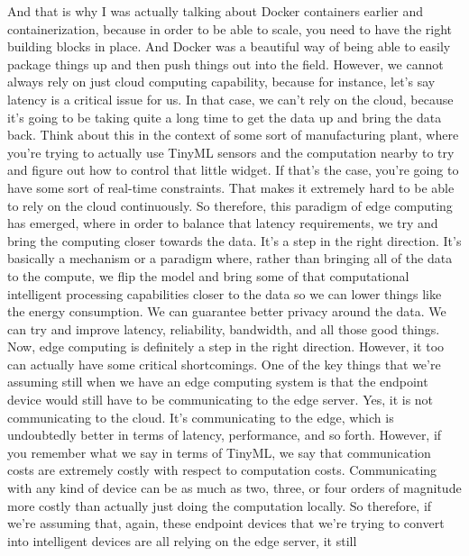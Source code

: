 {{{{{    And that is why I was actually talking about Docker containers earlier
    and containerization, because in order to be able to scale,
    you need to have the right building blocks in place.
    And Docker was a beautiful way of being able to easily
    package things up and then push things out into the field.
    However, we cannot always rely on just cloud computing capability,
    because for instance, let's say latency is a critical issue for us.
    In that case, we can't rely on the cloud,
    because it's going to be taking quite a long time to get the data up and bring
    the data back.
    Think about this in the context of some sort of manufacturing plant, where
    you're trying to actually use TinyML sensors and the computation
    nearby to try and figure out how to control that little widget.
    If that's the case, you're going to have some sort of real-time constraints.
    That makes it extremely hard to be able to rely on the cloud continuously.
    So therefore, this paradigm of edge computing
    has emerged, where in order to balance that latency requirements,
    we try and bring the computing closer towards the data.
    It's a step in the right direction.
    It's basically a mechanism or a paradigm where,
    rather than bringing all of the data to the compute, we flip the model
    and bring some of that computational intelligent processing capabilities
    closer to the data so we can lower things like the energy consumption.
    We can guarantee better privacy around the data.
    We can try and improve latency, reliability, bandwidth,
    and all those good things.
    Now, edge computing is definitely a step in the right direction.
    However, it too can actually have some critical shortcomings.
    One of the key things that we're assuming still
    when we have an edge computing system is that the endpoint device would still
    have to be communicating to the edge server.
    Yes, it is not communicating to the cloud.
    It's communicating to the edge, which is undoubtedly better in terms
    of latency, performance, and so forth.
    However, if you remember what we say in terms of TinyML,
    we say that communication costs are extremely costly with respect
    to computation costs.
    Communicating with any kind of device can
    be as much as two, three, or four orders of magnitude more costly than actually
    just doing the computation locally.
    So therefore, if we're assuming that, again,
    these endpoint devices that we're trying to convert into intelligent devices
    are all relying on the edge server, it still
}}}}}
